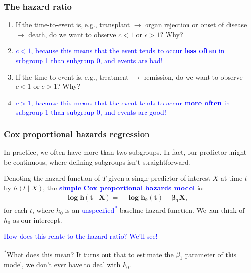 \documentclass[10pt,t]{beamer}
\begin{document}
\begin{frame}
\frametitle{The hazard ratio}
\begin{enumerate}
\item If the time-to-event is, e.g., transplant $\rightarrow$ organ rejection or onset of disease $\rightarrow$ death, do we want to observe $c < 1$ or $c > 1$? Why?

\bigskip

\item[] \textcolor{blue}{$c < 1$, because this means that the event tends to occur \textbf{less often} in subgroup 1 than subgroup 0, and events are bad!}

\bigskip

\item If the time-to-event is, e.g., treatment $\rightarrow$ remission, do we want to observe $c < 1$ or $c > 1$? Why?

\bigskip

\item[] \textcolor{blue}{$c > 1$, because this means that the event tends to occur \textbf{more often} in subgroup 1 than subgroup 0, and events are good!}
\end{enumerate}
\end{frame}

\begin{frame}
\frametitle{Cox proportional hazards regression}
In practice, we often have more than two subgroups. In fact, our predictor might be continuous, where defining subgroups  isn't straightforward.
\medskip

Denoting the hazard function of $T$ given a single predictor of interest $X$ at time $t$ by $h(t \mid X)$, the \textcolor{blue}{\textbf{simple Cox proportional hazards model}} is:
\begin{align*}
\mathbf{\log h(t \mid X)} = & \ \mathbf{\log h_0(t) + \boldsymbol{\beta}_1 X},
\end{align*}
for each $t$, where $h_0$ is an \textcolor{blue}{unspecified\textsuperscript{*}} baseline hazard function. We can think of $h_0$ as our intercept. 

\medskip

\textcolor{blue}{How does this relate to the hazard ratio? We'll see!}

\medskip

\textsuperscript{*}What does this mean? It turns out that to estimate the $\beta_1$ parameter of this model, we don't ever have to deal with $h_0$.
\end{frame}
\end{document}
